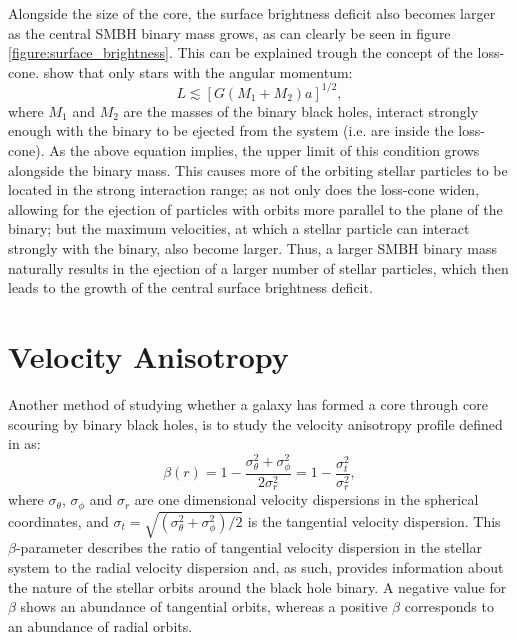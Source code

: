 \documentclass[english, oneside]{HYgradu}
\begin{document}
Alongside the size of the core, the surface brightness deficit also becomes larger as the central SMBH binary mass grows, as can clearly be seen in figure \ref{figure:surface_brightness}. This can be explained trough the concept of the loss-cone. \cite{BinneyTremaine} show that only stars with the angular momentum:
\begin{equation}
L \lesssim [G(M_1 + M_2)a]^{1/2}, \label{eq:loss-cone}
\end{equation}
where $M_1$ and $M_2$ are the masses of the binary black holes, interact strongly enough with the binary to be ejected from the system (i.e. are inside the loss-cone). As the above equation implies, the upper limit of this condition grows alongside the binary mass. This causes more of the orbiting stellar particles to be located in the strong interaction range; as not only does the loss-cone widen, allowing for the ejection of particles with orbits more parallel to the plane of the binary; but the maximum velocities, at which a stellar particle can interact strongly with the binary, also become larger. Thus, a larger SMBH binary mass naturally results in the ejection of a larger number of stellar particles, which then leads to the growth of the central surface brightness deficit.  

\section{Velocity Anisotropy}


Another method of studying whether a galaxy has formed a core through core scouring by binary black holes, is to study the velocity anisotropy profile defined in \cite{BinneyTremaine} as:
\begin{equation}
\beta(r) = 1 - \frac{\sigma_\theta^2 + \sigma_\phi^2}{2\sigma_r^2} = 1 - \frac{\sigma_t^2}{\sigma_r^2}, \label{eq:beta}
\end{equation}
where $\sigma_\theta$, $\sigma_\phi$ and $\sigma_r$ are one dimensional velocity dispersions in the spherical coordinates, and $\sigma_t = \sqrt{(\sigma_\theta^2 + \sigma_\phi^2) / 2}$ is the tangential velocity dispersion. This $\beta$-parameter describes the ratio of tangential velocity dispersion in the stellar system to the radial velocity dispersion and, as such, provides information about the nature of the stellar orbits around the black hole binary. A negative value for $\beta$ shows an abundance of tangential orbits, whereas a positive $\beta$ corresponds to an abundance of radial orbits. 
\end{document}
